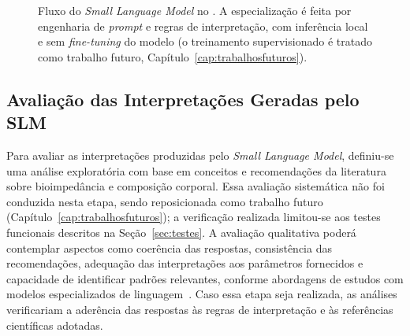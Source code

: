 \begin{figure}[!ht]
    \centering
    \caption{Fluxo do \emph{Small Language Model} no \sintonia. A especialização é feita por
    engenharia de \emph{prompt} e regras de interpretação, com inferência local e sem
    \emph{fine-tuning} do modelo (o treinamento supervisionado é tratado como trabalho futuro,
    Capítulo~\ref{cap:trabalhosfuturos}).}
    \label{fig:fluxoslm}
\end{figure}

\subsection{Avaliação das Interpretações Geradas pelo SLM}

Para avaliar as interpretações produzidas pelo \emph{Small Language Model}, definiu-se uma
análise exploratória com base em conceitos e recomendações da literatura sobre
bioimpedância e composição corporal. Essa avaliação sistemática não foi conduzida nesta
etapa, sendo reposicionada como trabalho futuro (Capítulo~\ref{cap:trabalhosfuturos}); a
verificação realizada limitou-se aos testes funcionais descritos na Seção~\ref{sec:testes}.
A avaliação qualitativa poderá contemplar aspectos como coerência das respostas,
consistência das recomendações, adequação das interpretações aos parâmetros fornecidos e
capacidade de identificar padrões relevantes, conforme abordagens de estudos com modelos
especializados de linguagem~\cite{abdin2024,touvron2024}. Caso essa etapa seja realizada,
as análises verificariam a aderência das respostas às regras de interpretação e às
referências científicas adotadas.

